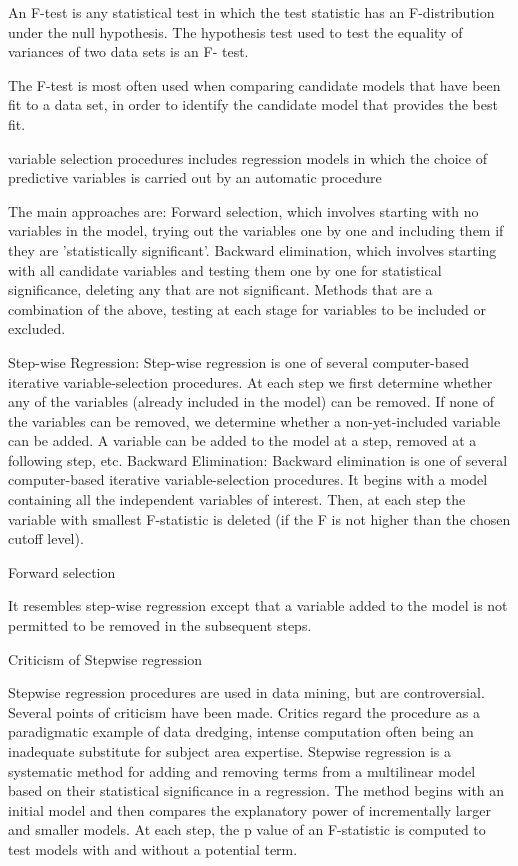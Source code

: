 
An F-test is any statistical test in which the test statistic has an F-distribution under the null hypothesis. The hypothesis test used to test the equality of variances of two data sets is an F- test.

The F-test is most often used when comparing candidate models that have been fit to a data set, in order to identify the candidate model that provides the best fit. 

variable selection procedures includes regression models in which the choice of predictive variables is carried out by an automatic procedure

The main approaches are:
Forward selection, which involves starting with no variables in the model, trying out the variables one by one and including them if they are 'statistically significant'.
Backward elimination, which involves starting with all candidate variables and testing them one by one for statistical significance, deleting any that are not significant.
Methods that are a combination of the above, testing at each stage for variables to be included or excluded.

Step-wise Regression:
Step-wise regression is one of several computer-based iterative variable-selection procedures. At each step we first determine whether any of the variables (already included in the model) can be removed. If none of the variables can be removed, we determine whether a non-yet-included variable can be added. A variable can be added to the model at a step, removed at a following step, etc.
Backward Elimination:
Backward elimination is one of several computer-based iterative variable-selection procedures. It begins with a model containing all the independent variables of interest. Then, at each step the variable with smallest F-statistic is deleted (if the F is not higher than the chosen cutoff level).

Forward selection 

It resembles step-wise regression except that a variable added to the model is not permitted to be removed in the subsequent steps.

Criticism of Stepwise regression

Stepwise regression procedures are used in data mining, but are controversial. Several points of criticism have been made.
Critics regard the procedure as a paradigmatic example of data dredging, intense computation often being an inadequate substitute for subject area expertise.
Stepwise regression is a systematic method for adding and removing terms from a multilinear model based on their statistical significance in a regression. The method begins with an initial model and then compares the explanatory power of incrementally larger and smaller models. At each step, the p value of an F-statistic is computed to test models with and without a potential term. 


